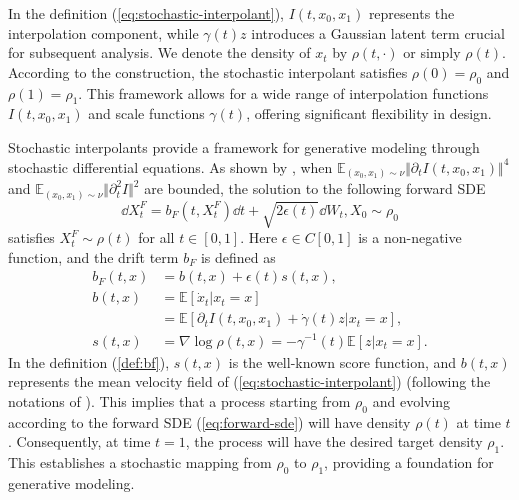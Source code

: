 In the definition (\ref{eq:stochastic-interpolant}), $I(t,x_0,x_1)$ represents the interpolation component, while $\gamma(t)z$ introduces a Gaussian latent term crucial for subsequent analysis. We denote the density of $x_t$ by $\rho(t,\cdot)$ or simply $\rho(t)$. According to the construction, the stochastic interpolant satisfies $\rho(0)=\rho_0$ and $\rho(1)=\rho_1$.
This framework allows for a wide range of interpolation functions $I(t,x_0,x_1)$ and scale functions $\gamma(t)$, offering significant flexibility in design.

Stochastic interpolants provide a framework for generative modeling through stochastic differential equations.
As shown by \citet{interpolation}, when $\mathbb{E}_{(x_0,x_1)\sim\nu}\Vert\partial_tI(t,x_0,x_1)\Vert^4$ and $\mathbb{E}_{(x_0,x_1)\sim\nu}\Vert\partial^2_tI\Vert^2$ are bounded, the solution to the following forward SDE
\begin{equation}
    \dd X_t^F=b_F(t,X_t^F)\dd t+\sqrt{2\epsilon(t)}\dd W_t,X_0\sim\rho_0
    \label{eq:forward-sde}
\end{equation}
satisfies $X_t^F\sim\rho(t)$ for all $t\in[0,1]$. Here $\epsilon\in C[0,1]$ is a non-negative function, and the drift term $b_F$ is defined as
\begin{equation}
    \begin{aligned}
        b_F(t,x)&=b(t,x)+\epsilon(t)s(t,x),\\
        b(t,x)&=\mathbb{E}[\dot{x}_t|x_t=x]\\
            &=\mathbb{E}[\partial_tI(t,x_0,x_1)+\dot{\gamma}(t)z|x_t=x],\\
        s(t,x)&=\nabla\log\rho(t,x)=-\gamma^{-1}(t)\mathbb{E}[z|x_t=x].
    \end{aligned}
    \label{def:bf}
\end{equation}
In the definition (\ref{def:bf}), $s(t,x)$ is the well-known score function, and $b(t,x)$ represents the mean velocity field of (\ref{eq:stochastic-interpolant}) (following the notations of \citealt{interpolation}). %
This implies that a process starting from $\rho_0$ and evolving according to the forward SDE (\ref{eq:forward-sde}) will have density $\rho(t)$ at time $t$. Consequently, at time $t=1$, the process will have the desired target density $\rho_1$. This establishes a stochastic mapping from $\rho_0$ to $\rho_1$, providing a foundation for generative modeling. 

